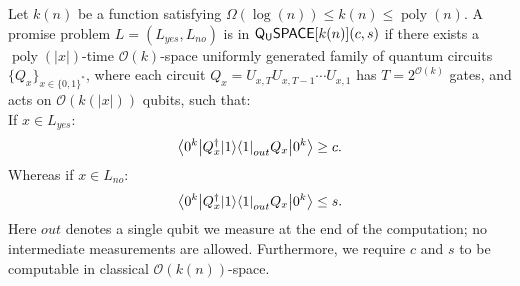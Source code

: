 \documentclass[a4paper,UKenglish]{lipics-v2016}
\newcommand\QSPACE{{\sf{Q_{U}SPACE}}}
\newcommand\bigoh{\mathcal{O}}
\DeclareMathOperator{\poly}{poly}
\begin{document}
\begingroup
\def\thedefinition{\ref{def: qspace}}
\begin{definition}
Let $k(n)$ be a function satisfying $\Omega(\log(n)) \le k(n) \le \poly(n)$. A promise problem $L=(L_{yes},L_{no})$ is in $\QSPACE[k(n)](c,s)$ if there exists a $\poly(|x|)$-time $\mathcal{O}(k)$-space uniformly generated family of quantum circuits $\{Q_x\}_{x\in\{0,1\}^*}$, where each circuit $Q_x=U_{x,T}U_{x,T-1}\cdots U_{x,1}$ has $T=2^{\mathcal{O}(k)}$ gates, and acts on $\mathcal{O}(k(|x|))$ qubits, such that:\\
 If $x \in L_{yes}$:
\begin{equation}
{\left\langle{0^k}\right\vert} Q^\dagger_x {\left\vert{1}\right\rangle}{\left\langle{1}\right\vert}_{out} Q_x {\left\vert{0^k}\right\rangle} \ge c.
\end{equation}
Whereas if $x \in L_{no}$:
\begin{equation}
{\left\langle{0^k}\right\vert} Q^\dagger_x {\left\vert{1}\right\rangle}{\left\langle{1}\right\vert}_{out} Q_x {\left\vert{0^k}\right\rangle} \le s.
\end{equation}
Here $out$ denotes a single qubit we measure at the end of the computation; no intermediate measurements are allowed.  
Furthermore, we require $c$ and $s$ to be computable in classical $\bigoh(k(n))$-space.
\end{definition}
\addtocounter{theorem}{-1}
\endgroup
\end{document}
